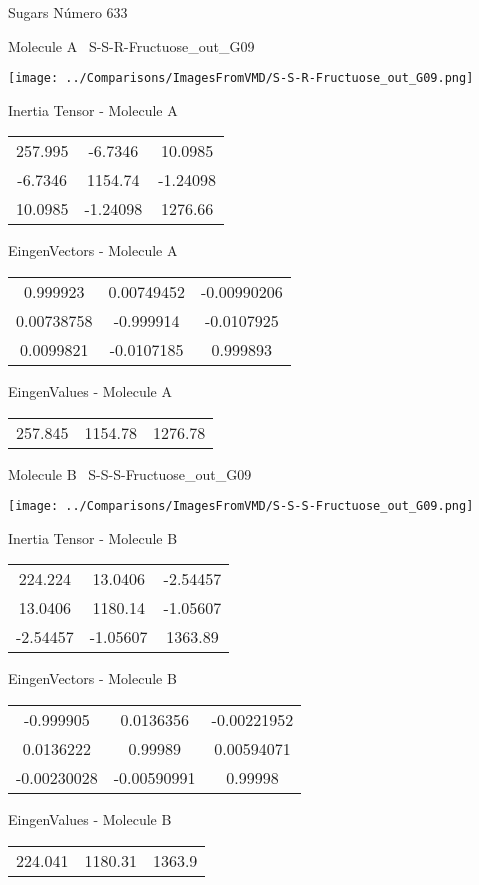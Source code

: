 \vtab[-3cm]
\begin{center}
{\large Sugars \tab Número 633}
\end{center}
\begin{multicols}{2}
\begin{center}

Molecule A \
S-S-R-Fructuose\_out\_G09

\texttt{[image: ../Comparisons/ImagesFromVMD/S-S-R-Fructuose\_out\_G09.png]}

Inertia Tensor - Molecule A \\
\begin{tabular}{|c c c|}
257.995	 & 	-6.7346	 & 	10.0985	 \\
-6.7346	 & 	1154.74	 & 	-1.24098	 \\
10.0985	 & 	-1.24098	 & 	1276.66
\end{tabular}

\vtab
 EingenVectors - Molecule A     \\
\begin{tabular}{|c c c|}
0.999923	 & 	0.00749452	 & 	-0.00990206	 \\
0.00738758	 & 	-0.999914	 & 	-0.0107925	 \\
0.0099821	 & 	-0.0107185	 & 	0.999893
\end{tabular}

\vtab
 EingenValues - Molecule A     \\
\begin{tabular}{|c c c|}
257.845	 & 	1154.78	 & 	1276.78	 \\
\end{tabular}
\columnbreak

Molecule B \
S-S-S-Fructuose\_out\_G09

\texttt{[image: ../Comparisons/ImagesFromVMD/S-S-S-Fructuose\_out\_G09.png]}

Inertia Tensor - Molecule B \\
\begin{tabular}{|c c c|}
224.224	 & 	13.0406	 & 	-2.54457	 \\
13.0406	 & 	1180.14	 & 	-1.05607	 \\
-2.54457	 & 	-1.05607	 & 	1363.89
\end{tabular}

\vtab
 EingenVectors - Molecule B     \\
\begin{tabular}{|c c c|}
-0.999905	 & 	0.0136356	 & 	-0.00221952	 \\
0.0136222	 & 	0.99989	 & 	0.00594071	 \\
-0.00230028	 & 	-0.00590991	 & 	0.99998
\end{tabular}

\vtab
 EingenValues - Molecule B     \\
\begin{tabular}{|c c c|}
224.041	 & 	1180.31	 & 	1363.9	 \\
\end{tabular}

\end{center}
\end{multicols}

